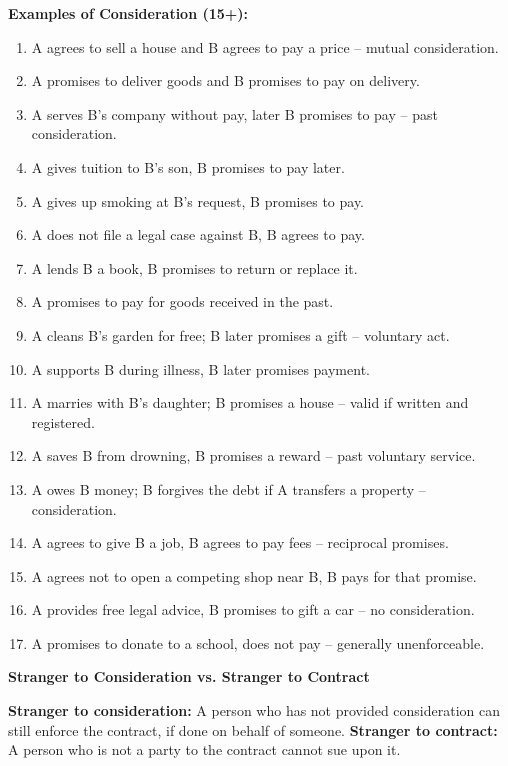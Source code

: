 \documentclass[12pt,a4paper]{book}
\begin{document}
\vspace{0.5cm}
\textbf{Examples of Consideration (15+):}
\begin{enumerate}
    \item A agrees to sell a house and B agrees to pay a price – mutual consideration.
    \item A promises to deliver goods and B promises to pay on delivery.
    \item A serves B’s company without pay, later B promises to pay – past consideration.
    \item A gives tuition to B’s son, B promises to pay later.
    \item A gives up smoking at B’s request, B promises to pay.
    \item A does not file a legal case against B, B agrees to pay.
    \item A lends B a book, B promises to return or replace it.
    \item A promises to pay for goods received in the past.
    \item A cleans B’s garden for free; B later promises a gift – voluntary act.
    \item A supports B during illness, B later promises payment.
    \item A marries with B’s daughter; B promises a house – valid if written and registered.
    \item A saves B from drowning, B promises a reward – past voluntary service.
    \item A owes B money; B forgives the debt if A transfers a property – consideration.
    \item A agrees to give B a job, B agrees to pay fees – reciprocal promises.
    \item A agrees not to open a competing shop near B, B pays for that promise.
    \item A provides free legal advice, B promises to gift a car – no consideration.
    \item A promises to donate to a school, does not pay – generally unenforceable.
\end{enumerate}

\vspace{0.5cm}
\textbf{Stranger to Consideration vs. Stranger to Contract}

\textbf{Stranger to consideration:} A person who has not provided consideration can still enforce the contract, if done on behalf of someone.  
\textbf{Stranger to contract:} A person who is not a party to the contract cannot sue upon it.
\end{document}
